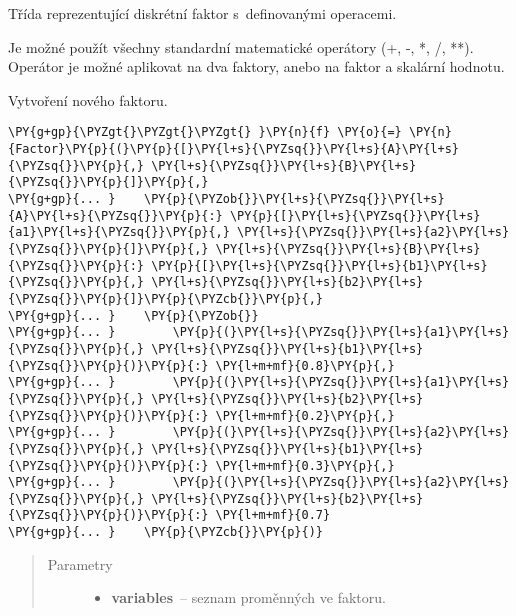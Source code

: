 \begin{fulllineitems}
\label{alex.infer:alex.infer.factor.Factor}
Třída reprezentující diskrétní faktor s~definovanými operacemi.

Je možné použít všechny standardní matematické operátory (+, -, *, /,
**). Operátor je možné aplikovat na dva faktory, anebo na faktor a
skalární hodnotu.

\begin{fulllineitems}
\label{alex.infer:alex.infer.factor.Factor.__init__}
Vytvoření nového faktoru.

\begin{Verbatim}[commandchars=\\\{\}]
\PY{g+gp}{\PYZgt{}\PYZgt{}\PYZgt{} }\PY{n}{f} \PY{o}{=} \PY{n}{Factor}\PY{p}{(}\PY{p}{[}\PY{l+s}{\PYZsq{}}\PY{l+s}{A}\PY{l+s}{\PYZsq{}}\PY{p}{,} \PY{l+s}{\PYZsq{}}\PY{l+s}{B}\PY{l+s}{\PYZsq{}}\PY{p}{]}\PY{p}{,}
\PY{g+gp}{... }    \PY{p}{\PYZob{}}\PY{l+s}{\PYZsq{}}\PY{l+s}{A}\PY{l+s}{\PYZsq{}}\PY{p}{:} \PY{p}{[}\PY{l+s}{\PYZsq{}}\PY{l+s}{a1}\PY{l+s}{\PYZsq{}}\PY{p}{,} \PY{l+s}{\PYZsq{}}\PY{l+s}{a2}\PY{l+s}{\PYZsq{}}\PY{p}{]}\PY{p}{,} \PY{l+s}{\PYZsq{}}\PY{l+s}{B}\PY{l+s}{\PYZsq{}}\PY{p}{:} \PY{p}{[}\PY{l+s}{\PYZsq{}}\PY{l+s}{b1}\PY{l+s}{\PYZsq{}}\PY{p}{,} \PY{l+s}{\PYZsq{}}\PY{l+s}{b2}\PY{l+s}{\PYZsq{}}\PY{p}{]}\PY{p}{\PYZcb{}}\PY{p}{,}
\PY{g+gp}{... }    \PY{p}{\PYZob{}}
\PY{g+gp}{... }        \PY{p}{(}\PY{l+s}{\PYZsq{}}\PY{l+s}{a1}\PY{l+s}{\PYZsq{}}\PY{p}{,} \PY{l+s}{\PYZsq{}}\PY{l+s}{b1}\PY{l+s}{\PYZsq{}}\PY{p}{)}\PY{p}{:} \PY{l+m+mf}{0.8}\PY{p}{,}
\PY{g+gp}{... }        \PY{p}{(}\PY{l+s}{\PYZsq{}}\PY{l+s}{a1}\PY{l+s}{\PYZsq{}}\PY{p}{,} \PY{l+s}{\PYZsq{}}\PY{l+s}{b2}\PY{l+s}{\PYZsq{}}\PY{p}{)}\PY{p}{:} \PY{l+m+mf}{0.2}\PY{p}{,}
\PY{g+gp}{... }        \PY{p}{(}\PY{l+s}{\PYZsq{}}\PY{l+s}{a2}\PY{l+s}{\PYZsq{}}\PY{p}{,} \PY{l+s}{\PYZsq{}}\PY{l+s}{b1}\PY{l+s}{\PYZsq{}}\PY{p}{)}\PY{p}{:} \PY{l+m+mf}{0.3}\PY{p}{,}
\PY{g+gp}{... }        \PY{p}{(}\PY{l+s}{\PYZsq{}}\PY{l+s}{a2}\PY{l+s}{\PYZsq{}}\PY{p}{,} \PY{l+s}{\PYZsq{}}\PY{l+s}{b2}\PY{l+s}{\PYZsq{}}\PY{p}{)}\PY{p}{:} \PY{l+m+mf}{0.7}
\PY{g+gp}{... }    \PY{p}{\PYZcb{}}\PY{p}{)}
\end{Verbatim}
\begin{quote}\begin{description}
\item[{Parametry}] \leavevmode\begin{itemize}
\item {} 
\textbf{variables}~-- seznam proměnných ve faktoru.


\end{itemize}
\end{description}
\end{quote}
\end{fulllineitems}
\end{fulllineitems}

